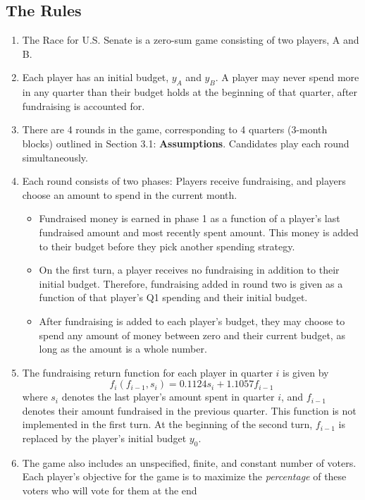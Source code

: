 \documentclass[11pt]{article}
\begin{document}
\subsection{The Rules}
\begin{enumerate}
\item The Race for U.S. Senate is a zero-sum game consisting of two players, A
and B.
\item Each player has an initial budget, \(y_A\) and \(y_B\). A player may
never spend more in any quarter than their budget holds at the beginning of that quarter, after fundraising is accounted for.
\item There are 4 rounds in the game, corresponding to 4 quarters (3-month
blocks) outlined in Section 3.1: \textbf{Assumptions}. Candidates play each
round simultaneously.
\item Each round consists of two phases: Players receive fundraising, and
players choose an amount to spend in the current month.
\begin{itemize}
\item Fundraised money is earned in phase 1 as a function of a player's last
fundraised amount and most recently spent amount. This money is added to
their budget before they pick another spending strategy.
\item On the first turn, a player receives no fundraising in addition to
their initial budget. Therefore, fundraising added in round two is given as a function of that player's Q1 spending and their initial budget.
\item After fundraising is added to each player's budget, they may choose to
spend any amount of money between zero and their current budget, as long as
the amount is a whole number.
\end{itemize}
\item The fundraising return function for each player in quarter $i$ is given
by
\begin{equation*}
f_i(f_{i-1}, s_i) = 0.1124s_i + 1.1057f_{i-1}
\end{equation*}
where $s_i$ denotes the last player's amount spent in quarter $i$, and
$f_{i-1}$ denotes their amount fundraised in the previous quarter. This
function is not implemented in the first turn. At the beginning of the
second turn, $f_{i-1}$ is replaced by the player's initial budget
$y_0$.
\item The game also includes an unspecified, finite, and constant number
of voters. Each player's objective for the game is to maximize the
\textit{percentage} of these voters who will vote for them at the end

\end{enumerate}
\end{document}
